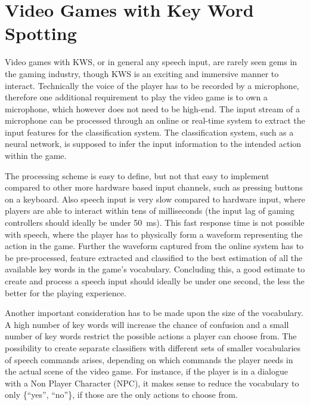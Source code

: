 
\section{Video Games with Key Word Spotting}\label{sec:intro_games}
Video games with KWS, or in general any speech input, are rarely seen gems in the gaming industry, though KWS is an exciting and immersive manner to interact.
Technically the voice of the player has to be recorded by a microphone, therefore one additional requirement to play the video game is to own a microphone, which however does not need to be high-end.
The input stream of a microphone can be processed through an online or real-time system to extract the input features for the classification system.
The classification system, such as a neural network, is supposed to infer the input information to the intended action within the game.

The processing scheme is easy to define, but not that easy to implement compared to other more hardware based input channels, such as pressing buttons on a keyboard.
Also speech input is very slow compared to hardware input, where players are able to interact within tens of milliseconds (the input lag of gaming controllers should ideally be under \SI{50}{\milli\second}).
This fast response time is not possible with speech, where the player has to physically form a waveform representing the action in the game.
Further the waveform captured from the online system has to be pre-processed, feature extracted and classified to the best estimation of all the available key words in the game's vocabulary.
Concluding this, a good estimate to create and process a speech input should ideally be under one second, the less the better for the playing experience.

Another important consideration has to be made upon the size of the vocabulary.
A high number of key words will increase the chance of confusion and a small number of key words restrict the possible actions a player can choose from.
The possibility to create separate classifiers with different sets of smaller vocabularies of speech commands arises, depending on which commands the player needs in the actual scene of the video game.
For instance, if the player is in a dialogue with a Non Player Character (NPC), it makes sense to reduce the vocabulary to only \{\enquote{yes}, \enquote{no}\}, if those are the only actions to choose from.

